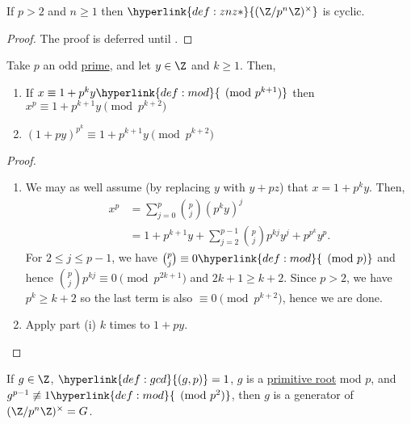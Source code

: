 \documentclass{article}
\begin{document}
\begin{nthm}\label{thm:2.9}
    If $p > 2$ and $n \geq 1$ then $\hyperlink{def:znz*}{(\Z/p^n \Z)^\times}$ is cyclic.
\end{nthm}

\begin{proof}
    The proof is deferred until .
\end{proof}

\begin{nlemma}\label{lem:2.10}
    Take $p$ an odd \hyperlink{def:prime}{prime}, and let $y \in \Z$ and $k \geq 1$. Then,
    \begin{enumerate}[label=(\roman*)]
        \item If $x \equiv 1 + p^k y \hyperlink{def:mod}{\pmod{p^{k+1}}}$ then $x^p \equiv 1 + p^{k+1} y \pmod{p^{k+2}}$
        \item $(1 + p y)^{p^k} \equiv 1 + p^{k+1} y \pmod{p^{k+2}}$
    \end{enumerate}
\end{nlemma}

\begin{proof}
    \leavevmode
    \begin{enumerate}[label=(\roman*)]
        \item We may as well assume (by replacing $y$ with $y + pz$) that $x = 1 + p^k y$. Then,
            \begin{align*}
                x^p &= \sum_{j=0}^p \binom{p}{j} (p^k y)^j \\
                    &= 1 + p^{k+1} y + \sum_{j=2}^{p-1} \binom{p}{j} p^{kj} y^j + p^{p^k} y^p.
            \end{align*}
            For $2 \leq j \leq p-1$, we have $\binom{p}{j} \equiv 0 \hyperlink{def:mod}{\pmod{p}}$ and hence $\binom{p}{j} p^{kj} \equiv 0 \pmod{p^{2k+1}}$ and $2k+1 \geq k+2$.
            Since $p > 2$, we have $p^k \geq k+2$ so the last term is also $\equiv 0 \pmod{p^{k+2}}$, hence we are done.

        \item Apply part (i) $k$ times to $1 + py$. \qedhere
    \end{enumerate}
\end{proof}

\begin{nlemma}\label{lem:2.11}
    If $g \in \Z$, $\hyperlink{def:gcd}{(g, p)} = 1$, $g$ is a \hyperlink{def:primRoot}{primitive root} mod $p$, and $g^{p-1} \not\equiv 1 \hyperlink{def:mod}{\pmod{p^2}}$, then $g$ is a generator of $(\Z/p^n \Z)^\times = G$.
\end{nlemma}
\end{document}
